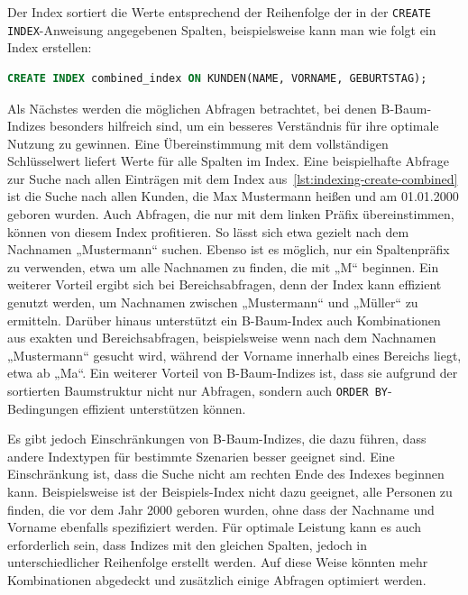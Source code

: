Der Index sortiert die Werte entsprechend der Reihenfolge der in der \texttt{CREATE INDEX}-Anweisung angegebenen Spalten, beispielsweise kann man wie folgt ein Index erstellen:

\vspace{-5pt}
\begin{lstlisting}[language=SQL,caption=B-Baum-Index bestehend aus mehreren Attributen,label={lst:indexing-create-combined}]
CREATE INDEX combined_index ON KUNDEN(NAME, VORNAME, GEBURTSTAG);
\end{lstlisting}
\vspace{-8pt}

Als Nächstes werden die möglichen Abfragen betrachtet, bei denen B-Baum-Indizes besonders hilfreich sind, um ein besseres Verständnis für ihre optimale Nutzung zu gewinnen.
Eine Übereinstimmung mit dem vollständigen Schlüsselwert liefert Werte für alle Spalten im Index.
Eine beispielhafte Abfrage zur Suche nach allen Einträgen mit dem Index aus~\ref{lst:indexing-create-combined} ist die Suche nach allen Kunden, die Max Mustermann heißen und am 01.01.2000 geboren wurden.
Auch Abfragen, die nur mit dem linken Präfix übereinstimmen, können von diesem Index profitieren.
So lässt sich etwa gezielt nach dem Nachnamen „Mustermann“ suchen.
Ebenso ist es möglich, nur ein Spaltenpräfix zu verwenden, etwa um alle Nachnamen zu finden, die mit „M“ beginnen.
Ein weiterer Vorteil ergibt sich bei Bereichsabfragen, denn der Index kann effizient genutzt werden, um Nachnamen zwischen „Mustermann“ und „Müller“ zu ermitteln.
Darüber hinaus unterstützt ein B-Baum-Index auch Kombinationen aus exakten und Bereichsabfragen, beispielsweise wenn nach dem Nachnamen „Mustermann“ gesucht wird, während der Vorname innerhalb eines Bereichs liegt, etwa ab „Ma“.
Ein weiterer Vorteil von B-Baum-Indizes ist, dass sie aufgrund der sortierten Baumstruktur nicht nur Abfragen, sondern auch \texttt{ORDER BY}-Bedingungen effizient unterstützen können.

Es gibt jedoch Einschränkungen von B-Baum-Indizes, die dazu führen, dass andere Indextypen für bestimmte Szenarien besser geeignet sind.
Eine Einschränkung ist, dass die Suche nicht am rechten Ende des Indexes beginnen kann.
Beispielsweise ist der Beispiels-Index nicht dazu geeignet, alle Personen zu finden, die vor dem Jahr 2000 geboren wurden, ohne dass der Nachname und Vorname ebenfalls spezifiziert werden.
Für optimale Leistung kann es auch erforderlich sein, dass Indizes mit den gleichen Spalten, jedoch in unterschiedlicher Reihenfolge erstellt werden.
Auf diese Weise könnten mehr Kombinationen abgedeckt und zusätzlich einige Abfragen optimiert werden.

